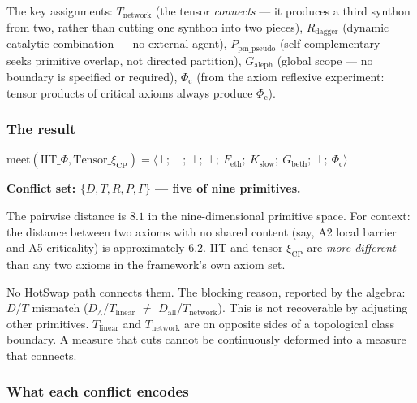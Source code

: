 \documentclass[12pt,a4paper]{article}
\begin{document}
The key assignments: $T_\text{network}$ (the tensor \emph{connects} --- it produces a third synthon from two, rather than cutting one synthon into two pieces), $R_\text{dagger}$ (dynamic catalytic combination --- no external agent), $P_\text{pm\_pseudo}$ (self-complementary --- seeks primitive overlap, not directed partition), $G_\text{aleph}$ (global scope --- no boundary is specified or required), $\Phi_\text{c}$ (from the axiom reflexive experiment: tensor products of critical axioms always produce $\Phi_\text{c}$).

\subsubsection{The result}

$\text{meet}(\mathrm{IIT}\_\Phi, \mathrm{Tensor}\_\xi_{\mathrm{CP}}) = \langle \bot;\ \bot;\ \bot;\ \bot;\ F_\text{eth};\ K_\text{slow};\ G_\text{beth};\ \bot;\ \Phi_\text{c} \rangle$

\textbf{Conflict set: $\{D, T, R, P, \Gamma\}$ --- five of nine primitives.}

The pairwise distance is $8.1$ in the nine-dimensional primitive space. For context: the distance between two axioms with no shared content (say, A2 local barrier and A5 criticality) is approximately $6.2$. IIT and tensor $\xi_\text{CP}$ are \emph{more different} than any two axioms in the framework's own axiom set.

No HotSwap path connects them. The blocking reason, reported by the algebra: $D$/$T$ mismatch ($D_\wedge$/$T_\text{linear}$ $\neq$ $D_\text{all}$/$T_\text{network}$). This is not recoverable by adjusting other primitives. $T_\text{linear}$ and $T_\text{network}$ are on opposite sides of a topological class boundary. A measure that cuts cannot be continuously deformed into a measure that connects.

\subsubsection{What each conflict encodes}
\end{document}
